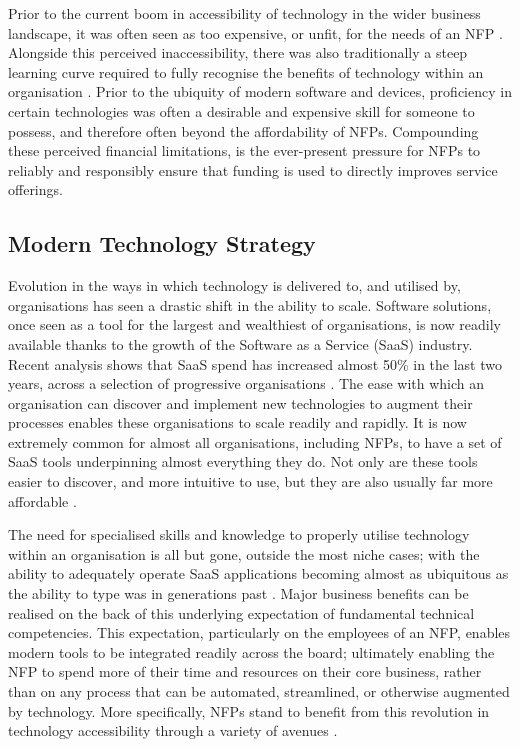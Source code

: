 Prior to the current boom in accessibility of technology in the wider business landscape, it was often seen as too expensive, or unfit, for the needs of an NFP \cite{infoxchange_2019} \cite{corder2001acquiring} \cite{le2008view}. Alongside this perceived inaccessibility, there was also traditionally a steep learning curve required to fully recognise the benefits of technology within an organisation \cite{mcwilliams1996time} \cite{lai2017literature}. Prior to the ubiquity of modern software and devices, proficiency in certain technologies was often a desirable and expensive skill for someone to possess, and therefore often beyond the affordability of NFPs. Compounding these perceived financial limitations, is the ever-present pressure for NFPs to reliably and responsibly ensure that funding is used to directly improves service offerings.

\subsection{Modern Technology Strategy}

Evolution in the ways in which technology is delivered to, and utilised by, organisations has seen a drastic shift in the ability to scale. Software solutions, once seen as a tool for the largest and wealthiest of organisations, is now readily available thanks to the growth of the Software as a Service (SaaS) industry. Recent analysis shows that SaaS spend has increased almost 50\% in the last two years, across a selection of progressive organisations \cite{blissfully2020}. The ease with which an organisation can discover and implement new technologies to augment their processes enables these organisations to scale readily and rapidly. It is now extremely common for almost all organisations, including NFPs, to have a set of SaaS tools underpinning almost everything they do. Not only are these tools easier to discover, and more intuitive to use, but they are also usually far more affordable \cite{ma2008pricing}.

The need for specialised skills and knowledge to properly utilise technology within an organisation is all but gone, outside the most niche cases; with the ability to adequately operate SaaS applications becoming almost as ubiquitous as the ability to type was in generations past \cite{garrido2010understanding} \cite{fischer2005computational} \cite{jackson2010international}. Major business benefits can be realised on the back of this underlying expectation of fundamental technical competencies. This expectation, particularly on the employees of an NFP, enables modern tools to be integrated readily across the board; ultimately enabling the NFP to spend more of their time and resources on their core business, rather than on any process that can be automated, streamlined, or otherwise augmented by technology. More specifically, NFPs stand to benefit from this revolution in technology accessibility through a variety of avenues \cite{kobelsky2014impact}.

